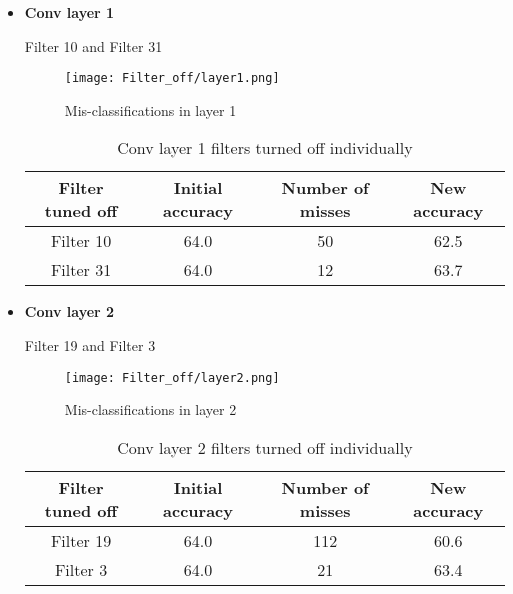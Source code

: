 \documentclass{article}
\begin{document}
\begin{itemize}
    \item \textbf{Conv layer 1}
    
        Filter 10 and Filter 31
        \begin{figure}[H]
            \centering
            \texttt{[image: Filter\_off/layer1.png]}
            \vspace{-2.0em}
            \caption{Mis-classifications in layer 1}
            \label{fig:l1_m1}
        \end{figure}

        \begin{table}[h!]
        \begin{center}
         \begin{tabular}{||c | c c c||}         
         \hline
        Filter tuned off & Initial accuracy  &  Number of misses &  New accuracy\\ [0.5ex] 
         \hline\hline
             Filter 10 & 64.0 & 50 & 62.5\\
             \hline
             Filter 31 & 64.0 & 12 & 63.7\\
         \hline
         \end{tabular}
        \end{center}
        \label{table:conv1_off}
        \vspace{-1.0em}
        \caption{Conv layer 1 filters turned off individually} 
        \end{table}


    \item \textbf{Conv layer 2}
    
        Filter 19 and Filter 3
        \begin{figure}[H]
            \centering
            \texttt{[image: Filter\_off/layer2.png]}
            \vspace{-2.0em}
            \caption{Mis-classifications in layer 2}
            \label{fig:l2_m1}
        \end{figure}
        
        \begin{table}[h!]
        \begin{center}
         \begin{tabular}{||c | c c c||}         
         \hline
        Filter tuned off & Initial accuracy  &  Number of misses &  New accuracy\\ [0.5ex] 
         \hline\hline
             Filter 19 & 64.0 & 112 & 60.6\\
             \hline
             Filter 3 & 64.0 & 21 & 63.4\\
         \hline
         \end{tabular}
        \end{center}
        \label{table:conv2_off}
        \vspace{-1.0em}
        \caption{Conv layer 2 filters turned off individually} 
        \end{table}


\end{itemize}
\end{document}
